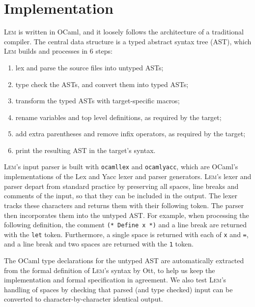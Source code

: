 \documentclass[a4paper]{llncs}
\newcommand{\myparagraph}[1]{\vspace{0.5\baselineskip}\par\noindent{\normalsize\bfseries{#1}}\quad}
\newcommand{\Lem}{\textsc{Lem}}
\begin{document}
\section{Implementation} \label{sec:impl}

\Lem{} is written in OCaml, and it loosely follows the architecture of a
traditional compiler.  The central data structure is a typed abstract syntax
tree (AST), which \Lem{} builds and processes in 6 steps:

\begin{enumerate}
\item lex and parse the source files into untyped ASTs;
\item type check the ASTs, and convert them into typed ASTs;
\item transform the typed ASTs with target-specific macros;
\item rename variables and top level definitions, as required by the target;
\item add extra parentheses and remove infix operators, as required by the target;
\item print the resulting AST in the target's syntax.
\end{enumerate}

\myparagraph{Lexing and parsing}
\Lem{}'s input parser is built with \texttt{ocamllex} and \texttt{ocamlyacc},
which are OCaml's implementations of the Lex and Yacc lexer and parser
generators.  \Lem{}'s lexer and parser depart from standard practice by
preserving all spaces, line breaks and comments of the input, so that they can
be included in the output.  The lexer tracks these characters and returns them
with their following token.  The parser then incorporates them into the untyped
AST.  For example, when processing the following definition, the comment
%
\verb|(* Define x *)|
%
and a line break are returned with the \texttt{let} token.  Furthermore, a
single space is returned with each of \texttt{x} and \texttt{=}, and a line
break and two spaces are returned with the \texttt{1} token.

{
\par{}}

\noindent The OCaml type declarations for the untyped AST are automatically extracted
from the formal definition of \Lem{}'s syntax by Ott, to help us keep the
implementation and formal specification in agreement.  We also test \Lem{}'s
handling of spaces by checking that parsed (and type checked) input can be
converted to character-by-character identical output.
\end{document}
